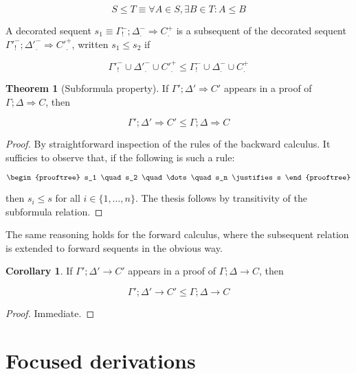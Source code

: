 \documentclass{article}
\theoremstyle{definition}
\newtheorem{theorem}{Theorem}
\newtheorem{corollary}{Corollary}
\newcommand{\subsequent}[2]{#1 \leq #2}
\begin{document}
\[
  S \leq T \equiv \forall A \in S, \exists B \in T : A \leq B
\]

\begin{definition}
  A decorated sequent $s_1 \equiv \Gamma^-_! ; \Delta^-_. \Longrightarrow C^+_.$
  is a subsequent of the decorated sequent
  $\Gamma'^-_! ; \Delta'^-_. \Longrightarrow C'^+_.$, written $s_1 \leq s_2$ if

  \[
    \subsequent{\Gamma'^-_! \cup \Delta'^-_. \cup C'^+_.}
    {\Gamma^-_! \cup \Delta^-_. \cup C^+_.}
  \]
\end{definition}

\begin{theorem}[Subformula property]
  If $\Gamma'; \Delta' \Longrightarrow C'$ appears in a proof of
  $\Gamma; \Delta \Longrightarrow C$, then

  \[
    \subsequent{\Gamma'; \Delta' \Longrightarrow C'}
    {\Gamma; \Delta \Longrightarrow C}
  \]
\end{theorem}
\begin{proof}
  By straightforward inspection of the rules of the backward calculus. It
  sufficies to observe that, if the following is such a rule:

  \[
    \begin{prooftree}
      s_1 \quad s_2 \quad \dots \quad s_n
      \justifies
      s
    \end{prooftree}
  \]

  then $s_i \leq s$ for all $i \in \{1, \dots, n\}$. The thesis follows by
  transitivity of the subformula relation.
\end{proof}

The same reasoning holds for the forward calculus, where the subsequent relation
is extended to forward sequents in the obvious way.

\begin{corollary}
  If $\Gamma'; \Delta' \longrightarrow C'$ appears in a proof of
  $\Gamma; \Delta \longrightarrow C$, then

  \[
    \subsequent{
      \Gamma'; \Delta' \longrightarrow C'
    }{
      \Gamma; \Delta \longrightarrow C
    }
  \]
\end{corollary}
\begin{proof}
  Immediate.
\end{proof}


\section{Focused derivations}
\end{document}
